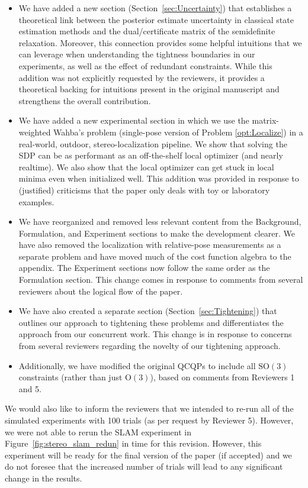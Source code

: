 \begin{itemize}
    \item We have added a new section (Section~\ref{sec:Uncertainty}) that establishes a theoretical link between the posterior estimate uncertainty in classical state estimation methods and the dual/certificate matrix of the semidefinite relaxation. Moreover, this connection provides some helpful intuitions that we can leverage when understanding the tightness boundaries in our experiments, as well as the effect of redundant constraints. While this addition was not explicitly requested by the reviewers, it provides a theoretical backing for intuitions present in the original manuscript and strengthens the overall contribution.
    \item We have added a new experimental section in which we use the matrix-weighted Wahba's problem (single-pose version of Problem \eqref{opt:Localize}) in a real-world, outdoor, stereo-localization pipeline. We show that solving the SDP can be as performant as an off-the-shelf local optimizer (and nearly realtime). We also show that the local optimizer can get stuck in local minima even when initialized well. This addition was provided in response to (justified) criticisms that the paper only deals with toy or laboratory examples.
    \item We have reorganized and removed less relevant content from the Background, Formulation, and Experiment sections to make the development clearer. We have also removed the localization with relative-pose measurements as a separate problem and have moved much of the cost function algebra to the appendix. The Experiment sections now follow the same order as the Formulation section. This change comes in response to comments from several reviewers about the logical flow of the paper.
    \item We have also created a separate section (Section~\ref{sec:Tightening}) that outlines our approach to tightening these problems and differentiates the approach from our concurrent work. This change is in response to concerns from several reviewers regarding the novelty of our tightening approach.
    \item Additionally, we have modified the original QCQPs to include all $\mbox{SO}(3)$ constraints (rather than just $\mbox{O}(3)$), based on comments from Reviewers 1 and 5.
\end{itemize}

We would also like to inform the reviewers that we intended to re-run all of the simulated experiments with 100 trials (as per request by Reviewer 5). However, we were not able to rerun the SLAM experiment in Figure~\ref{fig:stereo_slam_redun} in time for this revision. However, this experiment will be ready for the final version of the paper (if accepted) and we do not foresee that the increased number of trials will lead to any significant change in the results.

